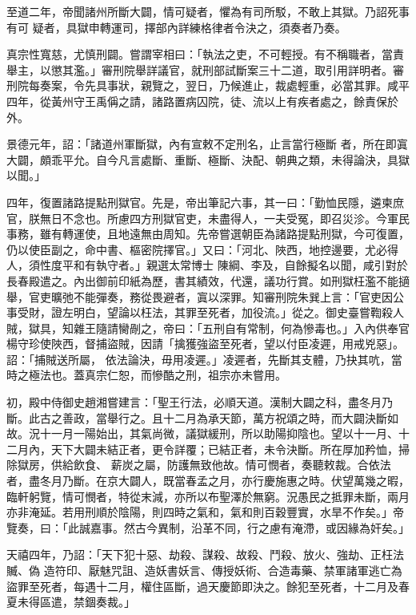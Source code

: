 \begin{pinyinscope}
 至道二年，帝聞諸州所斷大闢，情可疑者，懼為有司所駁，不敢上其獄。乃詔死事有可
 疑者，具獄申轉運司，擇部內詳練格律者令決之，須奏者乃奏。



 真宗性寬慈，尤慎刑闢。嘗謂宰相曰：「執法之吏，不可輕授。有不稱職者，當責舉主，以懲其濫。」審刑院舉詳議官，就刑部試斷案三十二道，取引用詳明者。審刑院每奏案，令先具事狀，親覽之，翌日，乃候進止，裁處輕重，必當其罪。咸平四年，從黃州守王禹偁之請，諸路置病囚院，徒、流以上有疾者處之，餘責保於外。



 景德元年，詔：「諸道州軍斷獄，內有宣敕不定刑名，止言當行極斷
 者，所在即寘大闢，頗乖平允。自今凡言處斷、重斷、極斷、決配、朝典之類，未得論決，具獄以聞。」



 四年，復置諸路提點刑獄官。先是，帝出筆記六事，其一曰：「勤恤民隱，遴柬庶官，朕無日不念也。所慮四方刑獄官吏，未盡得人，一夫受冤，即召災沴。今軍民事務，雖有轉運使，且地遠無由周知。先帝嘗選朝臣為諸路提點刑獄，今可復置，仍以使臣副之，命中書、樞密院擇官。」又曰：「河北、陜西，地控邊要，尤必得人，須性度平和有執守者。」親選太常博士
 陳綱、李及，自餘擬名以聞，咸引對於長春殿遣之。內出御前印紙為歷，書其績效，代還，議功行賞。如刑獄枉濫不能擿舉，官吏曠弛不能彈奏，務從畏避者，寘以深罪。知審刑院朱巽上言：「官吏因公事受財，證左明白，望論以枉法，其罪至死者，加役流。」從之。御史臺嘗鞫殺人賊，獄具，知雜王隨請臠剮之，帝曰：「五刑自有常制，何為慘毒也。」入內供奉官楊守珍使陜西，督捕盜賊，因請「擒獲強盜至死者，望以付臣凌遲，用戒兇惡」。詔：「捕賊送所屬，
 依法論決，毋用凌遲。」凌遲者，先斷其支體，乃抉其吭，當時之極法也。蓋真宗仁恕，而慘酷之刑，祖宗亦未嘗用。



 初，殿中侍御史趙湘嘗建言：「聖王行法，必順天道。漢制大闢之科，盡冬月乃斷。此古之善政，當舉行之。且十二月為承天節，萬方祝頌之時，而大闢決斷如故。況十一月一陽始出，其氣尚微，議獄緩刑，所以助陽抑陰也。望以十一月、十二月內，天下大闢未結正者，更令詳覆；已結正者，未令決斷。所在厚加矜恤，掃除獄房，供給飲食、
 薪炭之屬，防護無致他故。情可憫者，奏聽敕裁。合依法者，盡冬月乃斷。在京大闢人，既當春孟之月，亦行慶施惠之時。伏望萬幾之暇，臨軒躬覽，情可憫者，特從末減，亦所以布聖澤於無窮。況愚民之抵罪未斷，兩月亦非淹延。若用刑順於陰陽，則四時之氣和，氣和則百穀豐實，水旱不作矣。」帝覽奏，曰：「此誠嘉事。然古今異制，沿革不同，行之慮有淹滯，或因緣為奸矣。」



 天禧四年，乃詔：「天下犯十惡、劫殺、謀殺、故殺、鬥殺、放火、強劫、正枉法贓、偽
 造符印、厭魅咒詛、造妖書妖言、傳授妖術、合造毒藥、禁軍諸軍逃亡為盜罪至死者，每遇十二月，權住區斷，過天慶節即決之。餘犯至死者，十二月及春夏未得區遣，禁錮奏裁。」




\end{pinyinscope}
